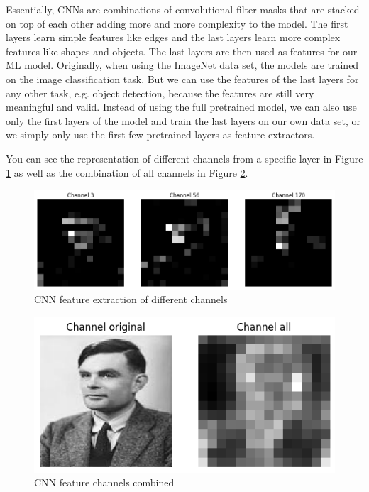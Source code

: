 Essentially, CNNs are combinations of convolutional filter masks that are stacked on top of each other adding more and more complexity to the model.
The first layers learn simple features like edges and the last layers learn more complex features like shapes and objects.
The last layers are then used as features for our ML model.
Originally, when using the ImageNet data set, the models are trained on the image classification task.
But we can use the features of the last layers for any other task, e.g. object detection, because the features are still very meaningful and valid.
Instead of using the full pretrained model, we can also use only the first layers of the model and train the last layers on our own data set, or we simply
only use the first few pretrained layers as feature extractors.

You can see the representation of different channels from a specific layer in Figure \ref{fig:cnn-features} as well as the combination of all channels in Figure \ref{fig:cnn-features-1}.

\begin{figure}[h]
  \centering
  \includegraphics[width=.95\textwidth]{images/cnn-0.png}
  \caption{CNN feature extraction of different channels}
  \label{fig:cnn-features}
\end{figure}

\begin{figure}[h]
  \centering
  \includegraphics[width=.95\textwidth]{images/cnn-1.png}
  \caption{CNN feature channels combined}
  \label{fig:cnn-features-1}
\end{figure}


